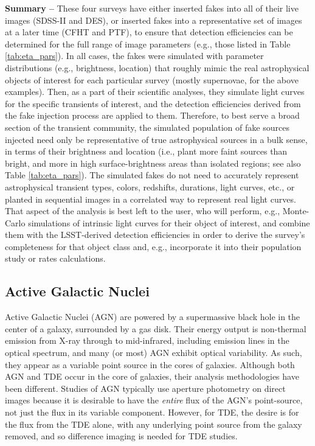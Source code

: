 \documentclass[DM,lsstdraft,toc]{lsstdoc}
\begin{document}
{\bf Summary --} These four surveys have either inserted fakes into all of their live images (SDSS-II and DES), or inserted fakes into a representative set of images at a later time (CFHT and PTF), to ensure that detection efficiencies can be determined for the full range of image parameters (e.g., those listed in Table \ref{tab:eta_pars}). In all cases, the fakes were simulated with parameter distributions (e.g., brightness, location) that roughly mimic the real astrophysical objects of interest for each particular survey (mostly supernovae, for the above examples). Then, as a part of their scientific analyses, they simulate light curves for the specific transients of interest, and the detection efficiencies derived from the fake injection process are applied to them. Therefore, to best serve a broad section of the transient community, the simulated population of fake sources injected need only be representative of true astrophysical sources in a bulk sense, in terms of their brightness and location (i.e., plant more faint sources than bright, and more in high surface-brightness areas than isolated regions; see also Table \ref{tab:eta_pars}). The simulated fakes do not need to accurately represent astrophysical transient types, colors, redshifts, durations, light curves, etc., or planted in sequential images in a correlated way to represent real light curves. That aspect of the analysis is best left to the user, who will perform, e.g., Monte-Carlo simulations of intrinsic light curves for their object of interest, and combine them with the LSST-derived detection efficiencies in order to derive the survey's completeness for that object class and, e.g., incorporate it into their population study or rates calculations.


\subsection{Active Galactic Nuclei}\label{ssec:sci_agn}

Active Galactic Nuclei (AGN) are powered by a supermassive black hole in the center of a galaxy, surrounded by a gas disk. Their energy output is non-thermal emission from X-ray through to mid-infrared, including emission lines in the optical spectrum, and many (or most) AGN exhibit optical variability. As such, they appear as a variable point source in the cores of galaxies. Although both AGN and TDE occur in the core of galaxies, their analysis methodologies have been different. Studies of AGN typically use aperture photometry on direct images because it is desirable to have the {\it entire} flux of the AGN's point-source, not just the flux in its variable component. However, for TDE, the desire is for the flux from the TDE alone, with any underlying point source from the galaxy removed, and so difference imaging is needed for TDE studies.
\end{document}
